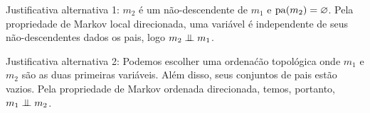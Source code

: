 \begin{exenumerate}
\begin{solution}
        Justificativa alternativa 1: $m_2$ \'e um n\~ao-descendente de $m_1$
        e $\mathrm{pa}(m_2) = \varnothing$. Pela propriedade de Markov local direcionada,
        uma vari\'avel \'e independente de seus n\~ao-descendentes
        dados os pais, logo $m_2 \mathrel{\perp\mspace{-10mu}\perp} m_1$.
        
        Justificativa alternativa 2: Podemos escolher uma ordena\'c\~ao
        topol\'ogica onde $m_1$ e $m_2$ s\~ao as duas primeiras
        vari\'aveis. Al\'em disso, seus conjuntos de pais est\~ao vazios. Pela
        propriedade de Markov ordenada direcionada, temos, portanto, $m_1 \mathrel{\perp\mspace{-10mu}\perp} m_2$.
        
    \end{solution}
    
    
\end{exenumerate}